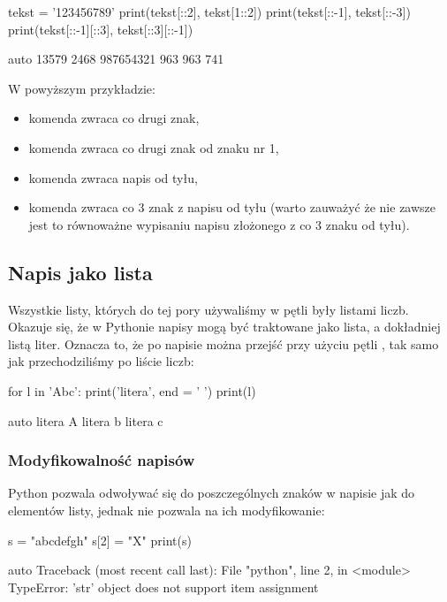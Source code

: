 \begin{CodeFrame}[python]{.7\textwidth}
tekst = '123456789'
print(tekst[::2], tekst[1::2])
print(tekst[::-1], tekst[::-3])
print(tekst[::-1][::3], tekst[::3][::-1])
\end{CodeFrame}
\begin{CodeFrame}{auto}
13579 2468
987654321 963
963 741
\end{CodeFrame}

\pagebreak[2]\noindent
W powyższym przykładzie:
\begin{itemize}
\item komenda  zwraca co drugi znak,
\item komenda  zwraca co drugi znak od znaku nr 1,
\item komenda  zwraca napis od tyłu,
\item komenda  zwraca co 3 znak z napisu od tyłu (warto zauważyć że nie zawsze jest to równoważne wypisaniu napisu złożonego z co 3 znaku od tyłu).
\end{itemize}

\subsection{Napis jako lista}

Wszystkie listy, których do tej pory używaliśmy w pętli  były listami liczb.
Okazuje się, że w Pythonie napisy mogą być traktowane jako lista, a dokładniej listą liter. 
Oznacza to, że po napisie można przejść przy użyciu pętli , tak samo jak przechodziliśmy po liście liczb:

\begin{CodeFrame}[python]{0.50\textwidth}
for l in 'Abc':
    print('litera', end = ' ')
    print(l)
\end{CodeFrame}
\begin{CodeFrame}{auto}
litera A
litera b
litera c
\end{CodeFrame}

\subsubsection{Modyfikowalność napisów}

Python pozwala odwoływać się do poszczególnych znaków w napisie jak do elementów listy, jednak nie pozwala na ich modyfikowanie:

\begin{CodeFrame}[python]{0.25\textwidth}
s = "abcdefgh"
s[2] = "X"
print(s)
\end{CodeFrame}
\begin{CodeFrame}{auto}
Traceback (most recent call last):
  File "python", line 2, in <module>
TypeError: 'str' object does not support item assignment
\end{CodeFrame}

